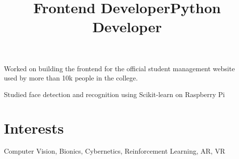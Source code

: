 \documentclass[margin]{res}
\begin{document}
\begin{resume}
      \title{\textbf{Frontend Developer}}
      \begin{position}
        Worked on building the frontend for the official student management website used by more than 10k people in the college.
      \end{position}

      \title{\textbf{Python Developer}}
      \begin{position}
        Studied face detection and recognition using Scikit-learn on Raspberry Pi
      \end{position}

    \section{Interests}
      Computer Vision, Bionics, Cybernetics, Reinforcement Learning, AR, VR
  \end{resume}
\end{document}
